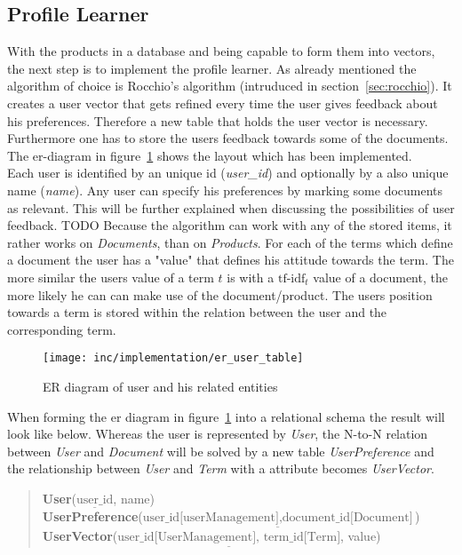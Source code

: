 
\subsection{Profile Learner}
With the products in a database and being capable to form them into vectors, the next step is to implement the profile learner.
As already mentioned the algorithm of choice is Rocchio's algorithm (intruduced in section~\ref{sec:rocchio}).
It creates a user vector that gets refined every time the user gives feedback about his preferences.
Therefore a new table that holds the user vector is necessary.
Furthermore one has to store the users feedback towards some of the documents.
The er-diagram in figure~\ref{fig:er_user_table} shows the layout which has been implemented.\\
Each user is identified by an unique id (\textit{user\_id}) and optionally by a also unique name (\textit{name}).
Any user can specify his preferences by marking some documents as relevant.
This will be further explained when discussing the possibilities of user feedback.
{\color{red}TODO}
Because the algorithm can work with any of the stored items, it rather works on \textit{Documents}, than on \textit{Products}.
For each of the terms which define a document the user has a "value" that defines his attitude towards the term.
The more similar the users value of a term $t$ is with a $\text{tf-idf}_t$ value of a document, the more likely he can can make use of the document/product.
The users position towards a term is stored within the relation between the user and the corresponding term.

\begin{figure}[h]
    \center
    \texttt{[image: inc/implementation/er\_user\_table]}
    \caption{ER diagram of user and his related entities}
    \label{fig:er_user_table}
\end{figure}

\noindent
When forming the er diagram in figure~\ref{fig:er_user_table} into a relational schema the result will look like below.
Whereas the user is represented by \textit{User}, the N-to-N relation between \textit{User} and \textit{Document} will be solved by a new table \textit{UserPreference} and the relationship between \textit{User} and \textit{Term} with a attribute becomes \textit{UserVector}.
\begin{quote}
    \textbf{User}($\underline{\text{user\_id}}$, name)\\
    \textbf{UserPreference}($\underline{\text{user\_id[userManagement]},\text{document\_id[Document]}}$)\\
    \textbf{UserVector}($\underline{\text{user\_id[UserManagement], term\_id[Term]}}$, value)\\
\end{quote}

